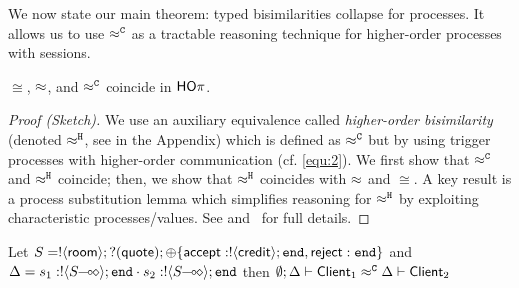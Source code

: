 \noi We now state our main theorem: typed bisimilarities collapse for \HOp processes. 
It allows us to use $\approx^\mathtt{C}$ as a tractable reasoning %
technique for higher-order processes with sessions.


\begin{theorem}[Coincidence]\rm
	\label{the:coincidence}
$\cong$, $\approx$,  and $\approx^\mathtt{C}$ coincide in $\mathsf{HO}\pi$. 
\end{theorem}

\begin{proof}[Proof (Sketch)]
We use an auxiliary equivalence called \emph{higher-order bisimilarity} (denoted $\approx^\mathtt{H}$, see  in the Appendix) which 
is defined as $\approx^\mathtt{C}$ but by
using  trigger processes with higher-order communication (cf. \eqref{equ:2}).
We first show that $\approx^\mathtt{C}$ and $\approx^\mathtt{H}$ coincide; then, we show that $\approx^\mathtt{H}$ coincides with $\approx$ and $\cong$.
A key result is a process substitution lemma which simplifies reasoning 
for $\approx^\mathtt{H}$
by exploiting characteristic processes/values.
See
and~\cite{KouzapasPY15} for full details.
\end{proof}

\begin{proposition}
	Let
	$S = ! \langle \mathsf{room} \rangle ; ? (\mathsf{quote}) ; \oplus \{\mathsf{accept}: ! \langle \mathsf{credit} \rangle ; \mathtt{end}, \mathsf{reject}: \mathtt{end}\}$
	and $\Delta = s_1: \btout{\lhot{S}} \tinact \cat s_2: \btout{\lhot{S}} \tinact$
	then
	$ \emptyset; \Delta \vdash \mathsf{Client}_1 \approx^\mathtt{C} \Delta \vdash \mathsf{Client}_2$
\end{proposition}

